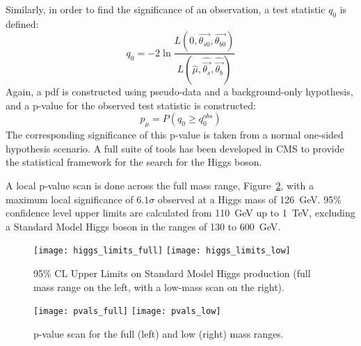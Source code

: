Similarly, in order to find the significance of an observation, a test statistic
$q_0$ is defined:
\begin{equation}
    q_0 = -2 \ln \frac{L (0, \vec{\theta_{s 0}}, \vec{\theta_{b 0}})}{L(\hat \mu,
    \hat{\vec{ \theta_{s}}}, \hat{\vec{ \theta_{b}}})}
\end{equation}
Again, a pdf is constructed using pseudo-data and a background-only hypothesis,
and a p-value for the observed test statistic is constructed:
\begin{equation}
    p_\mu = P(q_0 \ge q_0^{obs})
\end{equation}
The corresponding significance of this p-value is taken from a normal one-sided
hypothesis scenario.  A full suite of tools has been developed in CMS to provide
the statistical framework for the search for the Higgs boson\cite{higgsStats}.

A local p-value scan is done across the full mass range, Figure~\ref{fig:pvals},
with a maximum local significance of $6.1\sigma$ observed at a Higgs mass of
126~GeV. 95\% confidence level upper limits are calculated from 110~GeV up to
1~TeV, excluding a Standard Model Higgs boson in the ranges of 130 to 600~GeV.   

\begin{figure}[h]
\centering
\texttt{[image: higgs\_limits\_full]}
\texttt{[image: higgs\_limits\_low]} \\
\caption[95\% CL Upper Limits on Standard Model Higgs production.]{95\% CL Upper
Limits on Standard Model Higgs production (full mass range on the left, with a
low-mass scan on the right).}
\label{fig:higgsLimits}
\end{figure}

\begin{figure}[h]
\centering
\texttt{[image: pvals\_full]} 
\texttt{[image: pvals\_low]}\\
\caption[p-value scan.]{p-value scan for the full (left) and low (right) mass
ranges.}
\label{fig:pvals}
\end{figure}

\clearpage %


